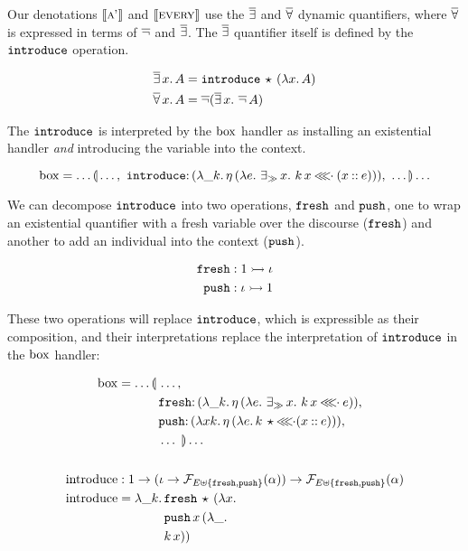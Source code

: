 Our denotations $\llbracket \textsc{a'} \rrbracket$ and $\llbracket \textsc{every} \rrbracket$ use the $\mathop{\overline{\exists}}$
and $\mathop{\overline{\forall}}$ dynamic quantifiers, where $\mathop{\overline{\forall}}$ is expressed in terms
of $\mathop{\overline{\lnot}}$ and $\mathop{\overline{\exists}}$. The $\mathop{\overline{\exists}}$ quantifier itself is defined by
the $\mathtt{introduce}$ operation.

\begin{align*}
  \mathop{\overline{\exists}} x.\,A &= \mathtt{introduce}\,\star\,(\lambda x.\, A) \\
  \mathop{\overline{\forall}} x.\,A &= \mathop{\overline{\lnot}} (\mathop{\overline{\exists}} x.\,\mathop{\overline{\lnot}} A)
\end{align*}

The $\mathtt{introduce}$ is interpreted by the $\mathrm{box}$ handler as installing an
existential handler \emph{and} introducing the variable into the context.

$$
\BOX = \ldots \banana{\ldots,\ \onto{\op{introduce}}{(\lam{\_ k}{\etaE{(\lam{e}{\existsr x.\ \ap{k}{x} \apll (x \cons e)})}})},\ \ldots} \ldots
$$

We can decompose $\mathtt{introduce}$ into two operations, $\mathtt{fresh}$ and
$\mathtt{push}$, one to wrap an existential quantifier with a fresh variable
over the discourse ($\mathtt{fresh}$) and another to add an individual into the
context ($\mathtt{push}$).

\begin{align*}
  \mathtt{fresh} &: 1 \rightarrowtail \iota \\
  \mathtt{push} &: \iota \rightarrowtail 1
\end{align*}

These two operations will replace $\mathtt{introduce}$, which is expressible as
their composition, and their interpretations replace the interpretation of
$\mathtt{introduce}$ in the $\mathrm{box}$ handler:

\begin{align*}
  \BOX &= \ldots \lban\begin{aligned}[t]
      &\ldots, \\
      &\onto{\op{fresh}}{(\lam{\_ k}{\etaE{(\lam{e}{\existsr x.\ \ap{k}{x} \apll e})}})}, \\
      &\onto{\op{push}}{(\lam{x k}{\etaE{(\lam{e}{\ap{k}{\star} \apll (x \cons e)})}})}, \\
      &\ldots\ \rban \ldots
    \end{aligned} \\
  \\
  \introduce &: 1 \to (\iota \to \FF_{E \uplus \{\op{fresh},
               \op{push}\}}(\alpha)) \to \FF_{E \uplus \{\op{fresh},
               \op{push}\}}(\alpha) \\
  \introduce &= \lam{\_ k}{\begin{aligned}[t]
      &\app{\op{fresh}}{\star}{(\lam{x}{ \\
      &\app{\op{push}}{x}{(\lam{\_}{ \\
      &\ap{k}{x}})}})}
    \end{aligned}}
\end{align*}


